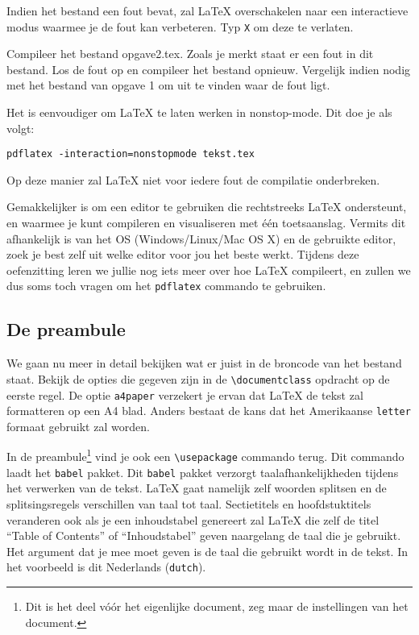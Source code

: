 \documentclass[12pt, dutch]{article}
\newcommand{\bs}{\textbackslash}
\begin{document}
Indien het bestand een fout bevat, zal \LaTeX{} overschakelen naar een
interactieve modus waarmee je de fout kan verbeteren. Typ \texttt{X} om deze te
verlaten.

\begin{tcolorbox}[title=Opgave 2]
  Compileer het bestand opgave2.tex. Zoals je merkt staat er een fout in dit
  bestand. Los de fout op en compileer het bestand opnieuw. Vergelijk indien nodig
  met het bestand van opgave 1 om uit te vinden waar de fout ligt.
\end{tcolorbox}
Het is eenvoudiger om \LaTeX{} te laten werken in nonstop-mode. Dit doe je als volgt:
\begin{center} \verb'pdflatex -interaction=nonstopmode tekst.tex' \end{center}
Op deze manier zal \LaTeX{} niet voor iedere fout de compilatie onderbreken.



Gemakkelijker is om een editor te gebruiken die rechtstreeks \LaTeX{} ondersteunt,
en waarmee je kunt compileren en visualiseren met \'e\'en toetsaanslag.
Vermits dit afhankelijk is van het OS (Windows/Linux/Mac OS X) en de gebruikte
editor, zoek je best zelf uit welke editor voor jou het beste werkt. Tijdens
deze oefenzitting leren we jullie nog iets meer over hoe \LaTeX{} compileert, en
zullen we dus soms toch vragen om het \texttt{pdflatex} commando te gebruiken.

\subsection{De preambule}
We gaan nu meer in detail bekijken wat er juist in de broncode van het bestand
staat. Bekijk de opties die gegeven zijn in de \texttt{\bs{}documentclass}
opdracht op de eerste regel. De optie \texttt{a4paper} verzekert je ervan dat
\LaTeX{} de tekst zal formatteren op een A4 blad. Anders bestaat de kans dat
het Amerikaanse \texttt{letter} formaat gebruikt zal worden.

In de preambule\footnote{Dit is het deel vóór het eigenlijke
  document, zeg maar de instellingen van het document.} vind je ook
een \texttt{\bs{}usepackage} commando terug. Dit commando laadt het
\texttt{babel} pakket. Dit \texttt{babel} pakket verzorgt taalafhankelijkheden
tijdens het verwerken van de tekst. \LaTeX{} gaat namelijk zelf
woorden splitsen en de splitsingsregels verschillen van taal tot
taal. Sectietitels en hoofdstuktitels veranderen ook als je een
inhoudstabel genereert zal \LaTeX{} die zelf de titel ``Table of
Contents'' of ``Inhoudstabel'' geven naargelang de taal die je
gebruikt. Het argument dat je mee moet geven is de taal die gebruikt
wordt in de tekst. In het voorbeeld is dit Nederlands (\texttt{dutch}).
\end{document}
